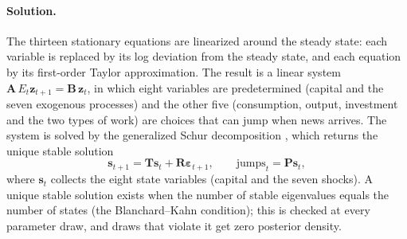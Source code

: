 \paragraph{Solution.} The thirteen stationary equations are linearized around the steady state: each variable is replaced by its log deviation from the steady state, and each equation by its first-order Taylor approximation. The result is a linear system $\bm{A}\,E_t\bm{z}_{t+1} = \bm{B}\,\bm{z}_t$, in which eight variables are predetermined (capital and the seven exogenous processes) and the other five (consumption, output, investment and the two types of work) are choices that can jump when news arrives. The system is solved by the generalized Schur decomposition \citep{Klein2000}, which returns the unique stable solution
\begin{equation}
\bm{s}_{t+1} = \bm{T}\bm{s}_t + \bm{R}\bm{\varepsilon}_{t+1},\qquad \text{jumps}_t = \bm{P}\bm{s}_t ,
\label{eq:solution}
\end{equation}
where $\bm{s}_t$ collects the eight state variables (capital and the seven shocks). A unique stable solution exists when the number of stable eigenvalues equals the number of states (the Blanchard--Kahn condition); this is checked at every parameter draw, and draws that violate it get zero posterior density.
